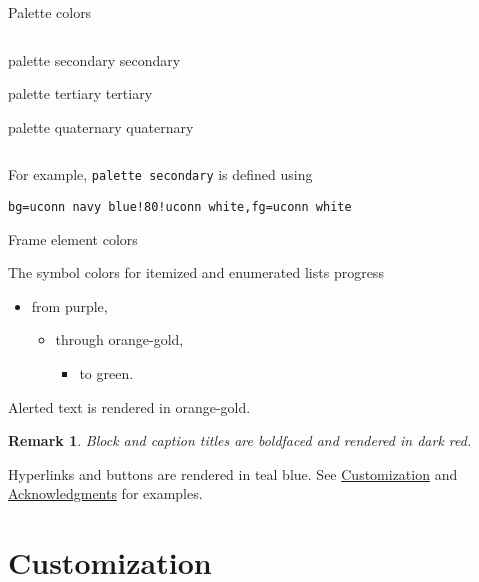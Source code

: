 \documentclass{beamer}
\newtheorem{remark}{Remark}
\begin{document}
\begin{frame}[fragile]{Palette colors}
\begin{columns}
\begin{column}{.5\textwidth}
\begin{beamercolorbox}[sep=4pt,center]{palette secondary}
secondary
\end{beamercolorbox}

\begin{beamercolorbox}[sep=4pt,center]{palette tertiary}
tertiary
\end{beamercolorbox}

\begin{beamercolorbox}[sep=4pt,center]{palette quaternary}
quaternary
\end{beamercolorbox}

\end{column}
\end{columns}

\vspace{2ex}
For example, \verb|palette secondary| is defined using
\begin{verbatim}
bg=uconn navy blue!80!uconn white,fg=uconn white
\end{verbatim}

\end{frame}


\begin{frame}{Frame element colors}

The symbol colors for itemized and enumerated lists progress
\begin{itemize}
\item from purple,
\begin{itemize}
\item through orange-gold,
\begin{itemize}
\item to green.
\end{itemize}
\end{itemize}
\end{itemize}
\alert{Alerted text is rendered in orange-gold.}

\vfill\begin{remark}
Block and caption titles are boldfaced and rendered in dark red.
\end{remark}

\vfill
Hyperlinks and buttons are rendered in teal blue.
See \hyperlink{sec:customization}{Customization} and \hyperlink{slide:acknowledgments}{Acknowledgments} for examples.

\end{frame}


\section{Customization}
\label{sec:customization}
\end{document}
